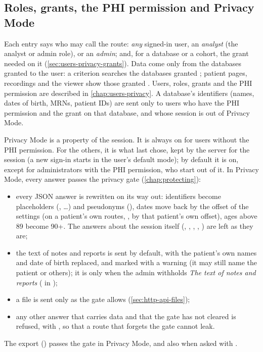 \subsection{Roles, grants, the PHI permission and Privacy Mode}
\label{sec:http-api-roles}

Each entry says who may call the route: \emph{any} signed-in user, an \emph{analyst} (the
analyst or admin role), or an \emph{admin}; and, for a database or a cohort, the grant needed on
it (\cref{sec:users-privacy-grants}). Data come only from the databases granted to the user: a
criterion searches the databases granted ; patient pages, recordings and the viewer
show those granted . Users, roles, grants and the PHI permission are described in
\cref{chap:users-privacy}. A database's identifiers (names, dates of birth, MRNs, patient IDs)
are sent only to users who have the PHI permission and the grant  on that database,
and whose session is out of Privacy Mode.

Privacy Mode is a property of the session. It is always on for users without the PHI
permission. For the others, it is what  last chose, kept by the server for
the session (a new sign-in starts in the user's default mode); by default it is on, except for
administrators with the PHI permission, who start out of it. In Privacy Mode, every answer passes
the privacy gate (\cref{chap:protecting}):
\begin{itemize}
\item every JSON answer is rewritten on its way out: identifiers become placeholders
  (, \ldots) and pseudonyms (), dates move back by the
  offset of the settings (on a patient's own routes, , by that
  patient's own offset), ages above 89 become 90+. The answers about the session itself
  (, , , , ) are left as they
  are;
\item the text of notes and reports is sent by default, with the patient's own names and date of
  birth replaced, and marked with a warning (it may still name the patient or others); it is
  \code{[Withheld]} only when the admin withholds \emph{The text of notes and reports}
  ( in );
\item a file is sent only as the gate allows (\cref{sec:http-api-files});
\item any other answer that carries data and that the gate has not cleared is refused, with
   , so that a
  route that forgets the gate cannot leak.
\end{itemize}
The export () passes the gate in Privacy Mode, and also when asked
with .

